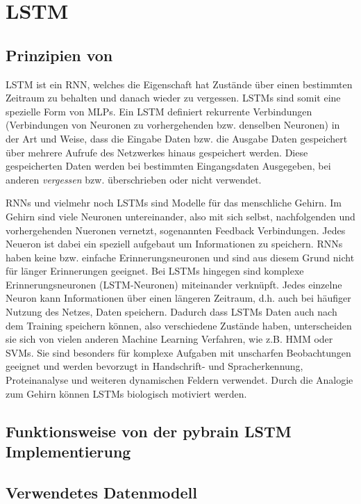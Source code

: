 \section{\acl{LSTM}}

\subsection{Prinzipien von }
\ac{LSTM} ist ein \ac{RNN}, welches die Eigenschaft hat Zustände über einen
bestimmten Zeitraum zu behalten und danach wieder zu vergessen. \acp{LSTM} sind
somit eine spezielle Form von \acp{MLP}. Ein \ac{LSTM} definiert rekurrente
Verbindungen (Verbindungen von Neuronen zu vorhergehenden bzw. denselben
Neuronen) in der Art und Weise, dass die Eingabe Daten bzw.
die Ausgabe Daten gespeichert über mehrere Aufrufe des Netzwerkes hinaus
gespeichert werden. Diese gespeicherten Daten werden bei bestimmten
Eingangsdaten Ausgegeben, bei anderen \textit{vergessen} bzw. überschrieben oder
nicht verwendet. 
 
\acp{RNN} und vielmehr noch \acp{LSTM} sind Modelle für das menschliche Gehirn.
Im Gehirn sind viele Neuronen untereinander, also mit sich selbst, nachfolgenden
und vorhergehenden Nueronen vernetzt, sogenannten Feedback Verbindungen. Jedes
Neueron ist dabei ein speziell aufgebaut um Informationen zu speichern.
\acp{RNN} haben keine bzw. einfache Erinnerungsneuronen und sind aus diesem
Grund nicht für länger Erinnerungen geeignet. Bei \acp{LSTM} hingegen sind
komplexe Erinnerungsneuronen (\ac{LSTM}-Neuronen) miteinander verknüpft. Jedes
einzelne Neuron kann Informationen über einen längeren Zeitraum, d.h. auch bei
häufiger Nutzung des Netzes, Daten speichern. Dadurch dass \acp{LSTM} Daten auch
nach dem Training speichern können, also verschiedene Zustände haben,
unterscheiden sie sich von vielen anderen Machine Learning Verfahren, wie z.B.
\ac{HMM} oder \acp{SVM}. Sie sind besonders für komplexe Aufgaben mit unscharfen
Beobachtungen geeignet und werden bevorzugt in Handschrift- und Spracherkennung,
Proteinanalyse und weiteren dynamischen Feldern verwendet. Durch die Analogie
zum Gehirn können \acp{LSTM} biologisch motiviert werden.
 
\subsection{Funktionsweise von der pybrain \acs{LSTM} Implementierung}

\subsection{Verwendetes Datenmodell}

